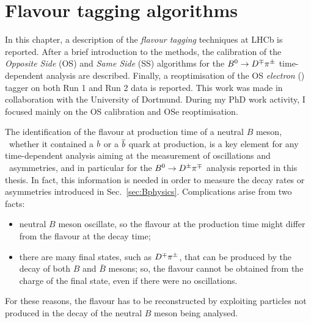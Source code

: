\section{Flavour tagging algorithms}
\label{sec:tagging}

In this chapter, a description of the \emph{flavour tagging} techniques at LHCb is reported.
After a brief introduction to the methods,
the calibration of the \emph{Opposite Side} (OS) and \emph{Same Side} (SS) algorithms for the $B^0\rightarrow D^\mp\pi^\pm$ 
time-dependent analysis are 
described. Finally, a reoptimisation of the OS \emph{electron} (\OSe) tagger on both Run 1 and Run 2 data is reported. 
This work was made in collaboration with the University of Dortmund. During my PhD work
activity, I focused mainly on the OS calibration and OSe reoptimisation.

The identification of the flavour at production time of a neutral $B$ meson, \ie~whether it contained a $b$ or a $\overline {b}$ quark at
production, is a key element 
for any time-dependent analysis aiming at the measurement of oscillations and \CP~asymmetries, and in particular for the $B^0\rightarrow
D^\pm\pi^\mp$ analysis reported in this thesis. In fact, this information is needed in order to measure the decay rates or asymmetries introduced in Sec.~\ref{sec:Bphysics}.
Complications arise from two facts:
\begin{itemize}[noitemsep,topsep=0pt]
	\item neutral $B$ meson oscillate, so the flavour at the production time might differ from the flavour at the decay time;
	\item there are many final states, such as $D^\mp\pi^\pm$, that can be produced by the decay of both $B$ and $\bar B$ mesons; so, the flavour cannot be obtained from the charge of the final state, even if there were no oscillations.
\end{itemize}
For these reasons, the flavour has to be reconstructed by exploiting particles not produced in the decay of the neutral $B$ meson being analysed.

